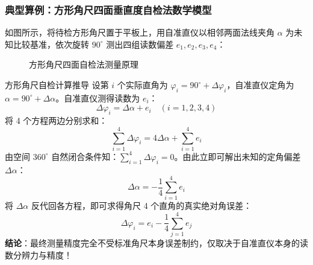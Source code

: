 \documentclass[11pt,a4paper]{ctexart}
\begin{document}
\subsubsection{典型算例：方形角尺四面垂直度自检法数学模型}
如图所示，将待检方形角尺置于平板上，用自准直仪以相邻两面法线夹角 $\alpha$ 为未知比较基准，依次旋转 $90^\circ$ 测出四组读数偏差 $e_1, e_2, e_3, e_4$：
\begin{figure}[htbp]
\centering
{}
\caption{方形角尺四面自检法测量原理}
\label{fig:square_autocheck}
\end{figure}

\begin{formulabox}{方形角尺自检计算推导}
设第 $i$ 个实际直角为 $\varphi_i = 90^\circ + \Delta\varphi_i$，自准直仪定角为 $\alpha = 90^\circ + \Delta\alpha$。自准直仪测得读数为 $e_i$：
\begin{equation}
\Delta\varphi_i = \Delta\alpha + e_i \quad (i=1, 2, 3, 4)
\end{equation}
将 4 个方程两边分别求和：
\[ \sum_{i=1}^4 \Delta\varphi_i = 4\Delta\alpha + \sum_{i=1}^4 e_i \]
由空间 $360^\circ$ 自然闭合条件知：$\sum_{i=1}^4 \Delta\varphi_i = 0$。由此立即可解出未知的定角偏差 $\Delta\alpha$：
\begin{equation}
\Delta\alpha = -\frac{1}{4} \sum_{i=1}^4 e_i
\end{equation}
将 $\Delta\alpha$ 反代回各方程，即可求得角尺 4 个直角的真实绝对角误差：
\begin{equation}
\Delta\varphi_i = e_i - \frac{1}{4} \sum_{j=1}^4 e_j
\end{equation}
\textbf{结论}：最终测量精度完全不受标准角尺本身误差制约，仅取决于自准直仪本身的读数分辨力与精度！
\end{formulabox}
\end{document}
